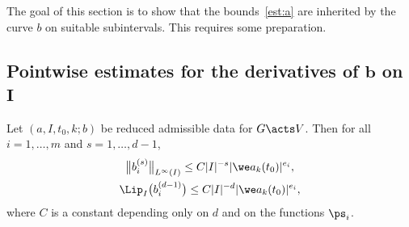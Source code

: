 The goal of this section is to show that the bounds~\eqref{est:a} are inherited by the curve $b$ on suitable subintervals.
This requires some preparation.

\subsection[Pointwise estimates for the derivatives of b on I]
{Pointwise estimates for the derivatives of $\boldsymbol b$ on~$\boldsymbol I$}
\begin{Lemma} %
 Let $(a, I, t_0, k; b)$ be reduced admissible data for $G \acts V$.
 Then for all
 $i=1,\dots,m$ and $s = 1,\dots,d-1$,
 \begin{gather}
 \big\| b_i^{(s)} \big\|_{L^\infty(I)} \le C |I|^{-s} |\we a_k (t_0)|^{e_i},\nonumber
 \\
 \Lip_I\big( b_i^{(d-1)}\big) \le C |I|^{-d} |\we a_k (t_0)|^{e_i},
\label{eq:b_ider}
 \end{gather}
 where $C$ is a constant depending only on $d$ and on the functions $\ps_i$.
\end{Lemma}

